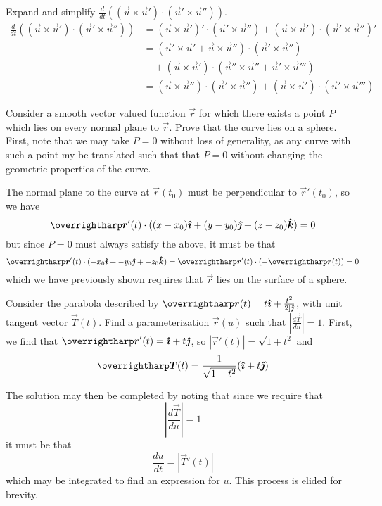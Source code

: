 \documentclass[../main.tex]{subfiles}
\begin{document}
        \begin{example}{}{}
                Expand and simplify \(\frac{d}{dt}\left((\vec{u}\times\vec{u}')\cdot(\vec{u}'\times\vec{u}'')\right)\).
                \tcblower
                \begin{align*}
                        \frac{d}{dt}\left((\vec{u}\times\vec{u}')\cdot(\vec{u}'\times\vec{u}'')\right)&=
                        (\vec{u}\times\vec{u}')'\cdot(\vec{u}'\times\vec{u}'')+(\vec{u}\times\vec{u}')\cdot(\vec{u}'\times\vec{u}'')'\\
                        &=(\vec{u}'\times\vec{u}'+\vec{u}\times\vec{u}'')\cdot(\vec{u}'\times\vec{u}'')\\
                        &\quad+(\vec{u}\times\vec{u}')\cdot(\vec{u}''\times\vec{u}''+\vec{u}'\times\vec{u}''')\\
                        &=(\vec{u}\times\vec{u}'')\cdot(\vec{u}'\times\vec{u}'')+(\vec{u}\times\vec{u}')\cdot(\vec{u}'\times\vec{u}''')
                \end{align*}
        \end{example}
        \begin{example}{}{}
                Consider a smooth vector valued function \(\vec{r}\) for which there exists a point \(P\) which lies on every normal plane to  \(\vec{r}\). Prove that the curve lies on a sphere.
                \tcblower
                First, note that we may take \(P=0\) without loss of generality, as any curve with such a point my be translated such that that \(P=0\) without changing the geometric properties of the curve.

                The normal plane to the curve at \(\vec{r}(t_0)\) must be perpendicular to \(\vec{r}'(t_0)\), so we have
                \[
                \vec{r}'(t)\cdot((x-x_0)\i+(y-y_0)\j+(z-z_0)\k)=0
                \]
                but since \(P=0\) must always satisfy the above, it must be that 
                \[
                \vec{r}'(t)\cdot(-x_0\i+-y_0\j+-z_0\k)=\vec{r}'(t)\cdot(-\vec{r}(t))=0
                \]
                which we have previously shown requires that \(\vec{r}\) lies on the surface of a sphere.
        \end{example}
        \begin{example}{}{}
                Consider the parabola described by \(\vec{r}(t)=t\i+\frac{t^2}{2]\j}\), with unit tangent vector \(\vec{T}(t)\). Find a parameterization \(\vec{r}(u)\) such that \(|\frac{d\vec{T}}{du}|=1\).
                \tcblower
                First, we find that \(\vec{r}'(t)=\i+t\j\), so \(|\vec{r}'(t)|=\sqrt{1+t^2}\) and
                \[
                \vec{T}(t)=\frac{1}{\sqrt{1+t^2}}(\i+t\j)
                \]

                The solution may then be completed by noting that since we require that
                \[
                \left|\frac{d\vec{T}}{du}\right|=1
                \]
                it must be that
                \[
                \frac{du}{dt}=|\vec{T}'(t)|
                \]
                which may be integrated to find an expression for \(u\). This process is elided for brevity.
        \end{example}
\end{document}
